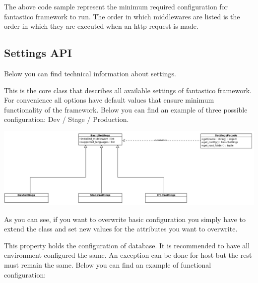 \documentclass[letterpaper,10pt,english]{sphinxmanual}
\begin{document}
The above code sample represent the minimum required configuration for fantastico framework to run. The order in which middlewares
are listed is the order in which they are executed when an http request is made.


\subsection{Settings API}
\label{get_started/settings:settings-api}
Below you can find technical information about settings.

\begin{fulllineitems}
\label{get_started/settings:fantastico.settings.BasicSettings}
This is the core class that describes all available settings of fantastico framework. For convenience all options
have default values that ensure minimum functionality of the framework. Below you can find an example of three possible 
configuration: Dev / Stage / Production.

\includegraphics{settings.png}

As you can see, if you want to overwrite basic configuration you simply have to extend the class and set new values
for the attributes you want to overwrite.

\begin{fulllineitems}
\label{get_started/settings:fantastico.settings.BasicSettings.database_config}
This property holds the configuration of database. It is recommended to have all environment configured the same.
An exception can be done for host but the rest must remain the same. Below you can find an example of functional
configuration:


\end{fulllineitems}
\end{fulllineitems}
\end{document}
